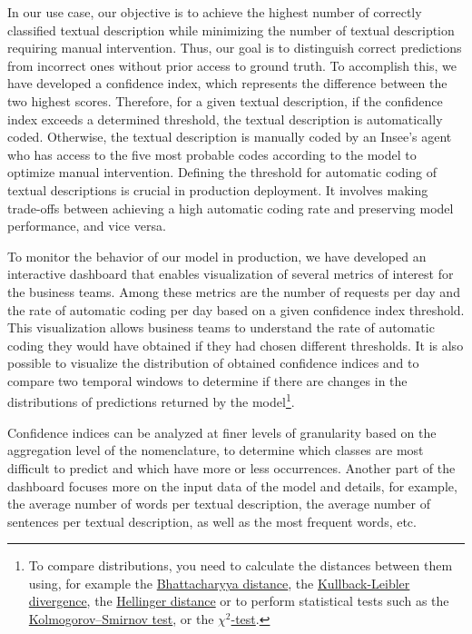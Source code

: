 
In our use case, our objective is to achieve the highest number of correctly classified textual description while minimizing the number of textual description requiring manual intervention. Thus, our goal is to distinguish correct predictions from incorrect ones without prior access to ground truth. To accomplish this, we have developed a confidence index, which represents the difference between the two highest scores. Therefore, for a given textual description, if the confidence index exceeds a determined threshold, the textual description is automatically coded. Otherwise, the textual description is manually coded by an Insee's agent who has access to the five most probable codes according to the model to optimize manual intervention. Defining the threshold for automatic coding of textual descriptions is crucial in production deployment. It involves making trade-offs between achieving a high automatic coding rate and preserving model performance, and vice versa.

To monitor the behavior of our model in production, we have developed an interactive dashboard that enables visualization of several metrics of interest for the business teams. Among these metrics are the number of requests per day and the rate of automatic coding per day based on a given confidence index threshold. This visualization allows business teams to understand the rate of automatic coding they would have obtained if they had chosen different thresholds. It is also possible to visualize the distribution of obtained confidence indices and to compare two temporal windows to determine if there are changes in the distributions of predictions returned by the model\footnote{To compare distributions, you need to calculate the distances between them using, for example the \href{https://en.wikipedia.org/wiki/Bhattacharyya_distance}{Bhattacharyya distance}, the \href{https://en.wikipedia.org/wiki/Kullback\%E2\%80\%93Leibler_divergence}{Kullback-Leibler divergence}, the \href{https://en.wikipedia.org/wiki/Hellinger_distance}{Hellinger distance} or to perform statistical tests such as the \href{https://en.wikipedia.org/wiki/Kolmogorov\%E2\%80\%93Smirnov_test}{Kolmogorov–Smirnov test}, or the \href{https://en.wikipedia.org/wiki/Chi-squared_test}{$\chi^2$-test}.}. 

Confidence indices can be analyzed at finer levels of granularity based on the aggregation level of the nomenclature, to determine which classes are most difficult to predict and which have more or less occurrences. Another part of the dashboard focuses more on the input data of the model and details, for example, the average number of words per textual description, the average number of sentences per textual description, as well as the most frequent words, etc.


